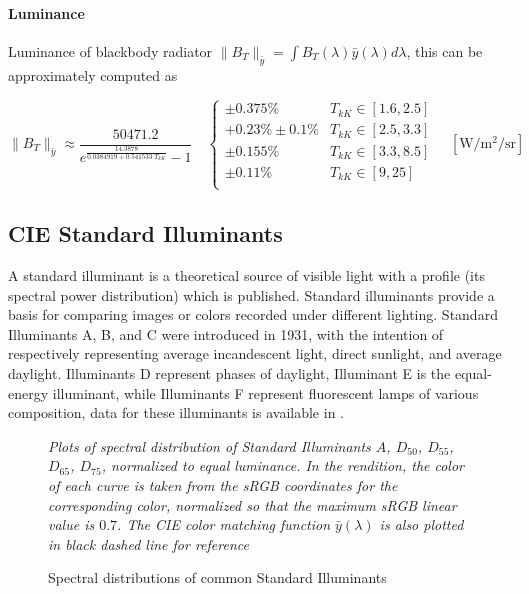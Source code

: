 \paragraph{Luminance}

Luminance of blackbody radiator $\|B_T\|_{\bar y} = \int B_T(\lambda)\bar y(\lambda) d\lambda$,
this can be approximately computed as

\begin{equation}
\|B_T\|_{\bar y} \approx \frac{50471.2}{e^{\frac{14.3878}{0.0384919 +
0.541533\; T_{kK}}}-1}
\quad \left\{\begin{array}{cl}
\pm 0.375\% & T_{kK} \in [1.6, 2.5] \\
+0.23\% \pm 0.1\% & T_{kK} \in [2.5, 3.3] \\
\pm 0.155\% & T_{kK} \in [3.3, 8.5] \\
\pm 0.11\%  & T_{kK} \in [9, 25] \\
\end{array}\right.
\quad \left[\si{\watt\per\square\meter\per\steradian}\right]
\end{equation}


\subsection{CIE Standard Illuminants}

A standard illuminant is a theoretical source of visible light with a profile
(its spectral
power distribution) which is published. Standard illuminants provide a basis for
comparing
images or colors recorded under different lighting. Standard Illuminants A, B,
and C were
introduced in 1931, with the intention of respectively representing average
incandescent light,
direct sunlight, and average daylight. Illuminants D represent phases of
daylight, Illuminant E
is the equal-energy illuminant, while Illuminants F represent fluorescent lamps
of various
composition, data for these illuminants is available in \cite{stdilluminants}.

\begin{figure}
{
\small
\centering

\caption{Spectral distributions of common Standard Illuminants}
\label{fig:illumspectra}
}
\vskip 1mm
{\footnotesize\it Plots of spectral distribution of
Standard Illuminants $A$, $D_{50}$, $D_{55}$, $D_{65}$, $D_{75}$,
normalized to equal luminance.
In the rendition, the color of each curve is taken from the
sRGB coordinates for the corresponding color,
normalized so that the maximum sRGB linear value is $0.7$.
The CIE color matching function $\bar y (\lambda)$ is also plotted in
black dashed line for reference}
\end{figure}

